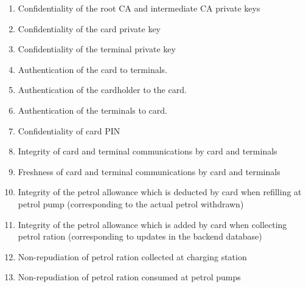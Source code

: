 \begin{enumerate}
  \item Confidentiality of the root CA and intermediate CA private keys
  \item Confidentiality of the card private key 
  \item Confidentiality of the terminal private key 
  \item Authentication of the card to terminals.
  \item Authentication of the cardholder to the card.
  \item Authentication of the terminals to card.
  \item Confidentiality of card PIN 
  \item Integrity of card and terminal communications by card and terminals
  \item Freshness of card and terminal communications by card and terminals
  \item Integrity of the petrol allowance which is deducted by card when refilling at petrol pump (corresponding to the actual petrol withdrawn)
  \item Integrity of the petrol allowance which is added by card when collecting petrol ration (corresponding to updates in the backend database)
  \item Non-repudiation of petrol ration collected at charging station
  \item Non-repudiation of petrol ration consumed at petrol pumps
\end{enumerate}
